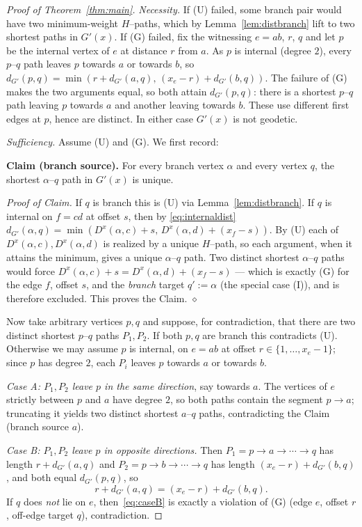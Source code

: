 \documentclass{amsart}
\theoremstyle{definition}
\begin{document}
\begin{proof}[Proof of Theorem~\ref{thm:main}]
\emph{Necessity.} If (U) failed, some branch pair would have two minimum-weight
$H$--paths, which by Lemma~\ref{lem:distbranch} lift to two shortest paths in
$G'(x)$. If (G) failed, fix the witnessing $e=ab$, $r$, $q$ and let $p$ be the
internal vertex of $e$ at distance $r$ from $a$. As $p$ is internal (degree $2$),
every $p$--$q$ path leaves $p$ towards $a$ or towards $b$, so
$d_{G'}(p,q)=\min(r+d_{G'}(a,q),\,(x_e-r)+d_{G'}(b,q))$. The failure of (G) makes
the two arguments equal, so both attain $d_{G'}(p,q)$: there is a shortest
$p$--$q$ path leaving $p$ towards $a$ and another leaving towards $b$. These use
different first edges at $p$, hence are distinct. In either case $G'(x)$ is not
geodetic.

\smallskip
\emph{Sufficiency.} Assume (U) and (G). We first record:

\smallskip
\noindent\textbf{Claim (branch source).} For every branch vertex $\alpha$ and
every vertex $q$, the shortest $\alpha$--$q$ path in $G'(x)$ is unique.

\noindent\emph{Proof of Claim.} If $q$ is branch this is (U) via
Lemma~\ref{lem:distbranch}. If $q$ is internal on $f=cd$ at offset $s$, then by
\eqref{eq:internaldist} $d_{G'}(\alpha,q)=\min(D^x(\alpha,c)+s,\,
D^x(\alpha,d)+(x_f-s))$. By (U) each of $D^x(\alpha,c),D^x(\alpha,d)$ is realized
by a unique $H$--path, so each argument, when it attains the minimum, gives a
unique $\alpha$--$q$ path. Two distinct shortest $\alpha$--$q$ paths would force
$D^x(\alpha,c)+s=D^x(\alpha,d)+(x_f-s)$ --- which is exactly (G) for the edge
$f$, offset $s$, and the \emph{branch} target $q':=\alpha$ (the special case
(I)), and is therefore excluded. This proves the Claim. \hfill$\diamond$

\smallskip
Now take arbitrary vertices $p,q$ and suppose, for contradiction, that there are
two distinct shortest $p$--$q$ paths $P_1,P_2$. If both $p,q$ are branch this
contradicts (U). Otherwise we may assume $p$ is internal, on $e=ab$ at offset
$r\in\{1,\dots,x_e-1\}$; since $p$ has degree $2$, each $P_i$ leaves $p$ towards
$a$ or towards $b$.

\emph{Case A: $P_1,P_2$ leave $p$ in the same direction}, say towards $a$. The
vertices of $e$ strictly between $p$ and $a$ have degree $2$, so both paths
contain the segment $p\to a$; truncating it yields two distinct shortest
$a$--$q$ paths, contradicting the Claim (branch source $a$).

\emph{Case B: $P_1,P_2$ leave $p$ in opposite directions.} Then
$P_1=p\to a\to\cdots\to q$ has length $r+d_{G'}(a,q)$ and
$P_2=p\to b\to\cdots\to q$ has length $(x_e-r)+d_{G'}(b,q)$, and both equal
$d_{G'}(p,q)$, so
\begin{equation}\label{eq:caseB}
 r+d_{G'}(a,q)=(x_e-r)+d_{G'}(b,q).
\end{equation}
If $q$ does \emph{not} lie on $e$, then~\eqref{eq:caseB} is exactly a violation
of (G) (edge $e$, offset $r$, off-edge target $q$), contradiction.


\end{proof}
\end{document}
